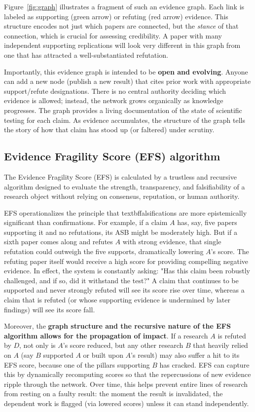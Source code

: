 \documentclass{article}
\begin{document}
Figure~\ref{fig:graph} illustrates a fragment of such an evidence graph. Each link is labeled as supporting (green arrow) or refuting (red arrow) evidence. This structure encodes not just which papers are connected, but the \emph{stance} of that connection, which is crucial for assessing credibility. A paper with many independent supporting replications will look very different in this graph from one that has attracted a well-substantiated refutation.

Importantly, this evidence graph is intended to be \textbf{open and evolving}. Anyone can add a new node (publish a new result) that cites prior work with appropriate support/refute designations. There is no central authority deciding which evidence is allowed; instead, the network grows organically as knowledge progresses. The graph provides a living documentation of the state of scientific testing for each claim. As evidence accumulates, the structure of the graph tells the story of how that claim has stood up (or faltered) under scrutiny.



\subsection{Evidence Fragility Score (EFS) algorithm}
The Evidence Fragility Score (EFS) is calculated by a trustless and recursive algorithm designed to evaluate the strength, transparency, and falsifiability of a research object without relying on consensus, reputation, or human authority.

EFS operationalizes the principle that textbf{falsifications are more epistemically significant than confirmations}. For example, if a claim $A$ has, say, five papers supporting it and no refutations, its ASB might be moderately high. But if a sixth paper comes along and refutes $A$ with strong evidence, that single refutation could outweigh the five supports, dramatically lowering $A$'s score. The refuting paper itself would receive a high score for providing compelling negative evidence. In effect, the system is constantly asking: "Has this claim been robustly challenged, and if so, did it withstand the test?" A claim that continues to be supported and never strongly refuted will see its score rise over time, whereas a claim that is refuted (or whose supporting evidence is undermined by later findings) will see its score fall.

Moreover, the \textbf{graph structure and the recursive nature of the EFS algorithm allows for the propagation of impact}. If a research $A$ is refuted by $D$, not only is $A$'s score reduced, but any other research $B$ that heavily relied on $A$ (say $B$ supported $A$ or built upon $A$'s result) may also suffer a hit to its EFS score, because one of the pillars supporting $B$ has cracked. EFS can capture this by dynamically recomputing scores so that the repercussions of new evidence ripple through the network. Over time, this helps prevent entire lines of research from resting on a faulty result: the moment the result is invalidated, the dependent work is flagged (via lowered scores) unless it can stand independently. 
\end{document}
